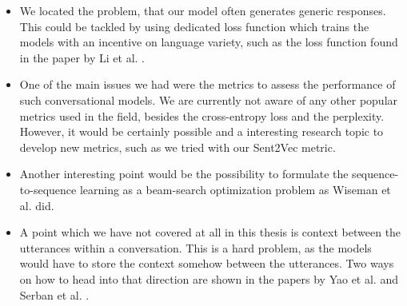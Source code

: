 \begin{itemize}
  \item We located the problem, that our model often generates generic responses. This could be tackled by using dedicated loss function which trains the models with an incentive on language variety, such as the loss function found in the paper by Li et al. \cite{Li:2016}.

  \item One of the main issues we had were the metrics to assess the performance of such conversational models. We are currently not aware of any other popular metrics used in the field, besides the cross-entropy loss and the perplexity. However, it would be certainly possible and a interesting research topic to develop new metrics, such as we tried with our Sent2Vec metric.

  \item Another interesting point would be the possibility to formulate the sequence-to-sequence learning as a beam-search optimization problem as Wiseman et al. \cite{Wiseman:2016} did.

  \item A point which we have not covered at all in this thesis is context between the utterances within a conversation. This is a hard problem, as the models would have to store the context somehow between the utterances. Two ways on how to head into that direction are shown in the papers by Yao et al. \cite{Yao:2015} and Serban et al. \cite{Serban:2015}.
\end{itemize}
